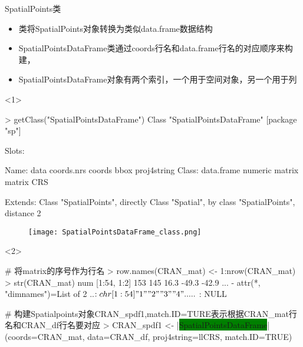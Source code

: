 \begin{frame}[t,fragile]{\subsecname}{SpatialPoints类}
\begin{itemize}
\item<1-> 类将SpatialPoints对象转换为类似data.frame数据结构
\item<2-> SpatialPointsDataFrame类通过coords行名和data.frame行名的对应顺序来构建，
\item<4-> SpatialPointsDataFrame对象有两个索引，一个用于空间对象，另一个用于列
\end{itemize}

\begin{overlayarea}{\textwidth}{\textheight}
\begin{onlyenv}<1>
\begin{rcode}
> getClass("SpatialPointsDataFrame")
Class "SpatialPointsDataFrame" [package "sp"]

Slots:                                                                  

Name:         data  coords.nrs      coords        bbox proj4string
Class:  data.frame     numeric      matrix      matrix         CRS

Extends: 
Class "SpatialPoints", directly
Class "Spatial", by class "SpatialPoints", distance 2
\end{rcode}
\begin{figure}[ht]\vspace{-10pt}
  \texttt{[image: SpatialPointsDataFrame\_class.png]}
\end{figure}
\end{onlyenv}

\begin{onlyenv}<2>
\begin{rcode}
# 将matrix的序号作为行名
> row.names(CRAN_mat) <- 1:nrow(CRAN_mat)
> str(CRAN_mat)
 num [1:54, 1:2] 153 145 16.3 -49.3 -42.9 ...
 - attr(*, "dimnames")=List of 2
  ..$ : chr [1:54] "1" "2" "3" "4" ...
  ..$ : NULL

# 构建Spatialpoints对象CRAN\_spdf1,match.ID=TURE表示根据CRAN\_mat行名和CRAN\_df行名要对应
> CRAN_spdf1 <- |\colorbox{green}{SpatialPointsDataFrame}|(coords=CRAN_mat, data=CRAN_df, proj4string=llCRS, match.ID=TRUE)
\end{rcode}
\end{onlyenv}


\end{overlayarea}
\end{frame}
